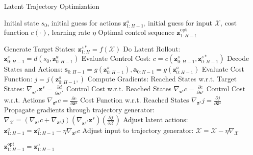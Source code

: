 \documentclass{article}
\begin{document}
\begin{algorithm}[H]
    \caption{Latent Trajectory Optimization}
    \label{alg:lto}
    \begin{algorithmic}[1]
        \Require Initial state \(s_0\), initial guess for actions \(\mathbf{z}_{1:H-1}^a\), initial guess for input \(\mathcal{X}\), cost function \(c(\cdot)\), learning rate \(\eta\)
        \Ensure Optimal control sequence \(\mathbf{z}_{1:H-1}^{\text{opt}}\)

        \Repeat
        \State Generate Target States: \(\mathbf{z}_{1:H}^{s*} = f(\mathcal{X})\)
        \State Do Latent Rollout: \(\mathbf{z}_{0:H-1}^s = d(s_0, \mathbf{z}_{0:H-1}^a)\)
        \State Evaluate Control Cost: \(c = c(\mathbf{z}_{0:H-1}^s, \mathbf{z}_{0:H-1}^{s*})\)
        \State Decode States and Actions: \(\mathbf{s}_{0:H-1} = g(\mathbf{z}_{0:H-1}^s), \mathbf{a}_{0:H-1} = g(\mathbf{z}_{0:H-1}^a)\)
        \State Evaluate Cost Function: \(j = j(\mathbf{z}^s_{0:H-1}, )\)
        \State Compute Gradients:
        \State \hspace{\algorithmicindent} Reached States w.r.t. Target States: \(\nabla_{{\mathbf{z}^s}^*}\mathbf{z}^s = \frac{\partial d}{\partial{\mathbf{z}^s}^*}\)
        \State \hspace{\algorithmicindent} Control Cost w.r.t. Reached States \(\nabla_{\mathbf{z}^s} c = \frac{\partial c}{\partial\mathbf{z}^s}\)
        \State \hspace{\algorithmicindent} Control Cost w.r.t. Actions \(\nabla_{\mathbf{z}^a} c = \frac{\partial c}{\partial \mathbf{z}^a}\)
        \State \hspace{\algorithmicindent} Cost Function w.r.t. Reached States \(\nabla_{\mathbf{z}^s} j = \frac{\partial j}{\partial \mathbf{z}^s}\)
        \State Propagate gradients through trajectory generator: \(\nabla_{\mathcal{X}} = (\nabla_{\mathbf{z}^s} c + \nabla_{\mathbf{z}^s}j ) \left( \nabla_{{\mathbf{z}^s}^*}{\mathbf{z}^s} \right) \left(\frac{\partial f}{\partial \mathcal{X}} \right)\)
        \State Adjust latent actions: \(\mathbf{z}_{1:H-1}^a = \mathbf{z}_{1:H-1}^a - \eta \nabla_{\mathbf{z}^a} c\)
        \State Adjust input to trajectory generator: \(\mathcal{X} = \mathcal{X} - \eta \nabla_{\mathcal{X}}\)

        \State \Return \(\mathbf{z}_{1:H-1}^{\text{opt}} = \mathbf{z}_{1:H-1}^a\)
        \EndFunction
    \end{algorithmic}
\end{algorithm}
\end{document}
